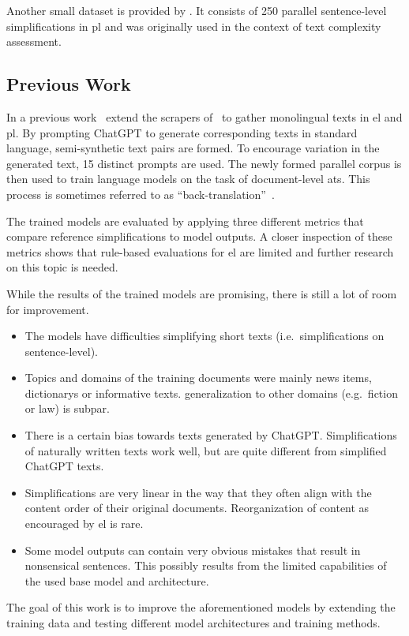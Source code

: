 Another small dataset is provided by \textcite{naderi2019subjective}.
It consists of 250 parallel sentence-level simplifications in \gls{pl} and was originally used in the context of text complexity assessment.


\subsection{Previous Work}\label{subsec:previous-work}

In a previous work~\textcite{klöser2024german} extend the scrapers of~\textcite{Ansch_tz_2023} to gather monolingual texts in \gls{el} and \gls{pl}.
By prompting ChatGPT to generate corresponding texts in standard language, semi-synthetic text pairs are formed.
To encourage variation in the generated text, 15 distinct prompts are used.
The newly formed parallel corpus is then used to train language models on the task of document-level \gls{ats}.
This process is sometimes referred to as \enquote{back-translation}~\autocite{sennrich-etal-2016-improving}.

The trained models are evaluated by applying three different metrics that compare reference simplifications to model outputs.
A closer inspection of these metrics shows that rule-based evaluations for \gls{el} are limited and further research on this topic is needed.

While the results of the trained models are promising, there is still a lot of room for improvement.
\begin{itemize}[noitemsep]
    \item The models have difficulties simplifying short texts (i.e.\ simplifications on sentence-level).
    \item Topics and domains of the training documents were mainly news items, dictionarys or informative texts.
    \gls{generalization} to other domains (e.g.\ fiction or law) is subpar.
    \item There is a certain bias towards texts generated by ChatGPT.
    Simplifications of naturally written texts work well, but are quite different from simplified ChatGPT texts.
    \item Simplifications are very linear in the way that they often align with the content order of their original documents.
    Reorganization of content as encouraged by \gls{el} is rare.
    \item Some model outputs can contain very obvious mistakes that result in nonsensical sentences.
    This possibly results from the limited capabilities of the used base model and architecture.
\end{itemize}
The goal of this work is to improve the aforementioned models by extending the training data and testing different model architectures and training methods.


%
